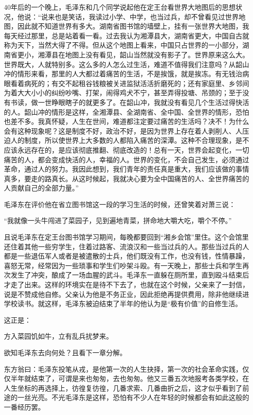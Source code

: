 \documentclass[../../dazhuan.tex]{subfiles}
\begin{document}
40年后的一个晚上，毛泽东和几个同学说起他在定王台看世界大地图后的思想状况，他说：“说来也是笑话，我读过小学、中学，也当过兵，却不曾看见过世界地图，因此就不知道世界有多大。湖南省图书馆的墙壁上，挂有一张世界大地图，我每天经过那里，总是站着看一看。过去我认为湘潭县大，湖南省更大，中国自古就称为天下，当然大得了不得。但从这个地图上看来，中国只占世界的一小部分，湖南省更小，湘潭县在地图上没有看见，韶山当然就没有影子了。世界原来这么大。世界既大，人就特别多。这么多的人怎么过生活，难道不值得我们注意吗？从韶山冲的情形来看，那里的人大都过着痛苦的生活，不是挨饿，就是挨冻。有无钱治病眼看着病死的；有交不起租谷钱粮被关进监狱活活折磨死的；还有家庭里、乡邻间为着大大小小的纠纷吵嘴、打架，闹得鸡犬不宁，甚至弄得投塘、吊颈的；至于没有书读，做一世睁眼瞎子的就更多了。在韶山冲，我就没有看见几个生活过得快活的人。韶山冲的情形是这样，全湘潭县、全湖南省、全中国、全世界的情形，恐怕也差不多。我真怀疑，人生在世间，难道都注定要过痛苦的生活吗？决不！为什么会有这种现象呢？这是制度不好，政治不好，是因为世界上存在着人剥削人、人压迫人的制度，所以使世界上大多数的人都陷入痛苦的深潭。这种不合理现象，是不应该永远存在的，是应该彻底推翻、彻底改造的！总有一天，世界会起变化，一切痛苦的人，都会变成快活的人，幸福的人。世界的变化，不会自己发生，必须通过革命，通过人的努力。我因此想到，我们青年的责任真是重大，我们应该做的事情真多，要走的路真长。从这时候起，我就决心要为全中国痛苦的人、全世界痛苦的人贡献自己的全部力量。”

毛泽东在评价他在省立图书馆这一段的学习生活的时候，还曾笑着对萧三说：

“我就像一头牛闯进了菜园子，见到遍地青菜，拼命地大嚼大吃，嚼个不停。”

且说毛泽东在定王台图书馆学习期间，每晚都要回到“湘乡会馆”里住。这个会馆里还住着其他一些穷学生，住着过路客、流浪汉和一些当过兵的人。那些当过兵的人都是一些退伍军人或者是被遣散的士兵，他们既没有工作，也没有钱，性情暴躁，喜怒无常，经常因为一些琐事和学生们吵架斗殴。有一天晚上，那些士兵和学生再次发生了冲突，酿成了一场血腥的武斗。毛泽东一直躲在厕所里，直到殴斗结束后才走了出来。这样的环境实在是待不下去了，也就在这个时候，父亲来了一封信，说是不赞成他自修。父亲认为他是不务正业，因此拒绝再提供费用，除非他继续进学校读书。就这样，毛泽东被迫结束了半年的他认为是“极有价值”的自修生活。

这正是：\begin{xemph}方入菜园饥如牛，立有乱兵扰梦来。\end{xemph}


欲知毛泽东去向何处？且看下一章分解。

东方翁曰：毛泽东投笔从戎，是他第一次的人生抉择，第一次的社会革命实践，仅仅半年就结束了，可谓是来也匆匆，去也匆匆。他又三番五次地报考各类学校，在人生坐标的再选择上，彷徨复彷徨，几番求索、几番曲折之后，这才似乎看到了前途的一丝光亮。不光毛泽东是这样，恐怕有不少人在年轻的时候都会有如此这般的一番经历罢。
\end{document}
